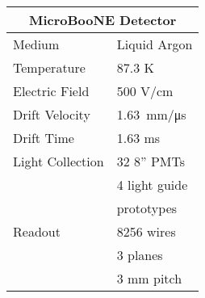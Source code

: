 \documentclass{article}
\begin{document}
\color{magenta}\begin{tabular}{| l | l |}
	\hline
	\multicolumn{2}{|c|}{\normalsize\color{black}\textbf{MicroBooNE Detector}} \\ \hline \hline
\color{black}Medium & \color{black} Liquid Argon \\ \hline
\color{black}Temperature & \color{black} 87.3 K 		\\ \hline
\color{black}Electric Field & \color{black} 500 V/cm 	\\ \hline
\color{black}Drift Velocity & \color{black} \SI{1.63}{\milli\meter/\micro\second}  \\ \hline
\color{black}Drift Time  & \color{black}1.63 ms \\ \hline %
\color{black}Light Collection & \color{black}32 8'' PMTs \\
  & \color{black} 4 light guide\\ 
  & \color{black}prototypes \\ \hline
\color{black}Readout & \color{black}8256 wires \\
 & \color{black} 3 planes \\
  & \color{black} 3 mm pitch \\ 
 \hline

\end{tabular}
\end{document}
